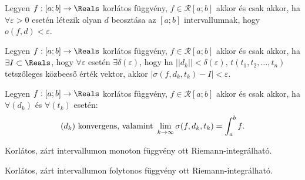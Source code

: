 %
\begin{theorem}
  Legyen $f: [a; b] \rightarrow \Reals$ korlátos függvény, $f \in \mathcal R
      [a; b]$ akkor és csak akkor, ha $\forall \varepsilon > 0$ esetén létezik
  olyan $d$ beosztása az $[a; b]$ intervallumnak, hogy $o(f, d) <
    \varepsilon$.

\end{theorem}

\begin{theorem}
  Legyen $f: [a; b] \rightarrow \Reals$ korlátos függvény, $f \in \mathcal R
      [a; b]$ akkor és csak akkor, ha $\exists I \subset \Reals$, hogy $\forall
    \varepsilon$ esetén $\exists \delta(\varepsilon)$, hogy ha $||d_k|| <
    \delta(\varepsilon)$, $t(t_1, t_2, \dots, t_n)$ tetszőleges közbeeső érték
  vektor, akkor $|\sigma(f, d_k, t_k) - I| < \varepsilon$.

\end{theorem}

\begin{theorem}
  Legyen $f: [a; b] \rightarrow \Reals$ korlátos függvény, $f \in \mathcal R
      [a; b]$ akkor és csak akkor, ha $\forall (d_k)$ és $\forall (t_k)$ esetén:
  \[
    (d_k) \text{ konvergens, valamint }
    \lim_{k \rightarrow \infty} \sigma(f, d_k, t_k) = \int_{a}^{b} f
    \text.
  \]

\end{theorem}


\begin{theorem}
  Korlátos, zárt intervallumon monoton függvény ott Riemann-integrálható.
\end{theorem}

\begin{theorem}
  Korlátos, zárt intervallumon folytonos függvény ott Riemann-integrálható.
\end{theorem}

